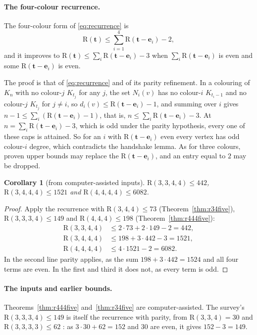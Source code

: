 \documentclass[11pt]{article}
\theoremstyle{spacedplain}
\newtheorem{corollary}[theorem]{Corollary}
\theoremstyle{spaceddef}
\theoremstyle{spacedremark}
\newcommand{\R}{\mathrm{R}}
\newcommand{\bt}{\mathbf{t}}
\newcommand{\e}{\mathbf{e}}
\begin{document}
\paragraph{The four-colour recurrence.}
The four-colour form of \eqref{eq:recurrence} \cite[6.1(a)]{Rad26} is
\[
\R(\bt)\le\sum_{i=1}^4\R(\bt-\e_i)-2 ,
\]
and it improves to $\R(\bt)\le\sum_i\R(\bt-\e_i)-3$ when $\sum_i\R(\bt-\e_i)$ is even and some $\R(\bt-\e_i)$ is even.

The proof is that of \eqref{eq:recurrence} and of its parity refinement.
In a colouring of $K_n$ with no colour-$j$ $K_{t_j}$ for any $j$, the set $N_i(v)$ has no colour-$i$ $K_{t_i-1}$ and no colour-$j$ $K_{t_j}$ for $j\ne i$, so $d_i(v)\le\R(\bt-\e_i)-1$, and summing over $i$ gives $n-1\le\sum_i(\R(\bt-\e_i)-1)$, that is, $n\le\sum_i\R(\bt-\e_i)-3$.
At $n=\sum_i\R(\bt-\e_i)-3$, which is odd under the parity hypothesis, every one of these caps is attained.
So for an $i$ with $\R(\bt-\e_i)$ even every vertex has odd colour-$i$ degree, which contradicts the handshake lemma.
As for three colours, proven upper bounds may replace the $\R(\bt-\e_i)$, and an entry equal to $2$ may be dropped.

\begin{corollary}[from computer-assisted inputs]\label{cor:four}
$\R(3,3,4,4)\le 442$, $\R(3,4,4,4)\le 1521$ and $\R(4,4,4,4)\le 6082$.
\end{corollary}

\begin{proof}
Apply the recurrence with $\R(3,4,4)\le 73$ (Theorem~\ref{thm:r34five}), $\R(3,3,3,4)\le 149$ \cite{Rad26} and $\R(4,4,4)\le 198$ (Theorem~\ref{thm:r444five}):
\begin{align*}
\R(3,3,4,4)&\le 2\cdot 73+2\cdot 149-2=442,\\
\R(3,4,4,4)&\le 198+3\cdot 442-3=1521,\\
\R(4,4,4,4)&\le 4\cdot 1521-2=6082.
\end{align*}
In the second line parity applies, as the sum $198+3\cdot 442=1524$ and all four terms are even.
In the first and third it does not, as every term is odd.
\end{proof}

\paragraph{The inputs and earlier bounds.}
Theorems~\ref{thm:r444five} and~\ref{thm:r34five} are computer-assisted.
The survey's $\R(3,3,3,4)\le 149$ is itself the recurrence with parity, from $\R(3,3,4)=30$ \cite{CFIM16} and $\R(3,3,3,3)\le 62$ \cite{FKR04}: as $3\cdot 30+62=152$ and $30$ are even, it gives $152-3=149$.
\end{document}
